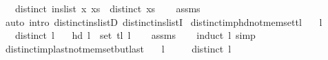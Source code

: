 \begin{isabellebody}
\ \ \ {\isachardoublequoteopen}distinct\ {\isacharparenleft}{\kern0pt}ins{\isacharunderscore}{\kern0pt}list\ x\ xs{\isacharparenright}{\kern0pt}\ {\isacharequal}{\kern0pt}\ distinct\ xs{\isachardoublequoteclose}%
\endisataginvisible
{\isafoldinvisible}%
%
\isadeliminvisible
\isanewline
%
\endisadeliminvisible
%
\isadelimproof
\ \ %
\endisadelimproof
%
\isatagproof
{}\isamarkupfalse%
\ assms\isanewline
\ \ \isamarkupfalse%
\ {\isacharparenleft}{\kern0pt}auto\ intro{\isacharcolon}{\kern0pt}\ distinct{\isacharunderscore}{\kern0pt}ins{\isacharunderscore}{\kern0pt}listD\ distinct{\isacharunderscore}{\kern0pt}ins{\isacharunderscore}{\kern0pt}listI{\isacharparenright}{\kern0pt}%
\endisatagproof
{\isafoldproof}%
%
\isadelimproof
\isanewline
%
\endisadelimproof
%
\isadeliminvisible
\isanewline
%
\endisadeliminvisible
%
\isataginvisible
{}\isamarkupfalse%
\ distinct{\isacharunderscore}{\kern0pt}imp{\isacharunderscore}{\kern0pt}hd{\isacharunderscore}{\kern0pt}not{\isacharunderscore}{\kern0pt}mem{\isacharunderscore}{\kern0pt}set{\isacharunderscore}{\kern0pt}tl{\isacharcolon}{\kern0pt}\isanewline
\ \ \ {\isachardoublequoteopen}l\ {\isasymnoteq}\ {\isacharbrackleft}{\kern0pt}{\isacharbrackright}{\kern0pt}{\isachardoublequoteclose}\isanewline
\ \ \ {\isachardoublequoteopen}distinct\ l{\isachardoublequoteclose}\isanewline
\ \ \ {\isachardoublequoteopen}hd\ l\ {\isasymnotin}\ set\ {\isacharparenleft}{\kern0pt}tl\ l{\isacharparenright}{\kern0pt}{\isachardoublequoteclose}%
\endisataginvisible
{\isafoldinvisible}%
%
\isadeliminvisible
\isanewline
%
\endisadeliminvisible
%
\isadelimproof
\ \ %
\endisadelimproof
%
\isatagproof
{}\isamarkupfalse%
\ assms\isanewline
\ \ \isamarkupfalse%
\ {\isacharparenleft}{\kern0pt}induct\ l{\isacharparenright}{\kern0pt}\ simp{\isacharplus}{\kern0pt}%
\endisatagproof
{\isafoldproof}%
%
\isadelimproof
\isanewline
%
\endisadelimproof
%
\isadeliminvisible
\isanewline
%
\endisadeliminvisible
%
\isataginvisible
{}\isamarkupfalse%
\ distinct{\isacharunderscore}{\kern0pt}imp{\isacharunderscore}{\kern0pt}last{\isacharunderscore}{\kern0pt}not{\isacharunderscore}{\kern0pt}mem{\isacharunderscore}{\kern0pt}set{\isacharunderscore}{\kern0pt}butlast{\isacharcolon}{\kern0pt}\isanewline
\ \ \ {\isachardoublequoteopen}l\ {\isasymnoteq}\ {\isacharbrackleft}{\kern0pt}{\isacharbrackright}{\kern0pt}{\isachardoublequoteclose}\isanewline
\ \ \ {\isachardoublequoteopen}distinct\ l{\isachardoublequoteclose}\isanewline

\end{isabellebody}
